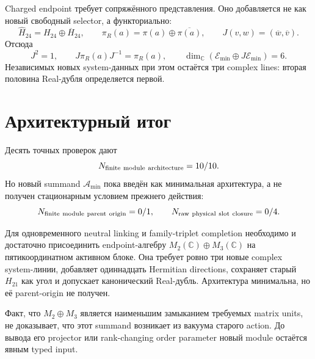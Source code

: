 Charged endpoint требует сопряжённого представления. Оно добавляется не
как новый свободный selector, а функториально:
\begin{equation}
 \widehat H_{24}=H_{24}\oplus\overline{H}_{24},\qquad
 \pi_R(a)=\pi(a)\oplus\overline{\pi(a)},\qquad
 J(v,w)=(\overline w,\overline v).
 \label{eq:v9-finite-module-real-double}
\end{equation}
Отсюда
\begin{equation}
 J^2=1,\qquad J\pi_R(a)J^{-1}=\pi_R(a),
 \qquad
 \dim_{\mathbb C}(\mathcal E_{\min}\oplus J\mathcal E_{\min})=6.
 \label{eq:v9-finite-module-real-identities}
\end{equation}
Независимых новых system-данных при этом остаётся три complex lines:
вторая половина Real-дубля определяется первой.

\section{Архитектурный итог}

Десять точных проверок дают
\begin{equation}
 N_{\rm finite\ module\ architecture}=10/10.
 \label{eq:v9-finite-module-architecture-ledger}
\end{equation}
Но новый summand $\mathcal A_{\min}$ пока введён как минимальная
архитектура, а не получен стационарным условием прежнего действия:
\begin{equation}
 N_{\rm finite\ module\ parent\ origin}=0/1,\qquad
 N_{\rm raw\ physical\ slot\ closure}=0/4.
 \label{eq:v9-finite-module-origin-ledger}
\end{equation}

\begin{theorem}
Для одновременного neutral linking и family-triplet completion необходимо и
достаточно присоединить endpoint-алгебру
$M_2(\mathbb C)\oplus M_3(\mathbb C)$ на пятикоординатном активном блоке.
Она требует ровно три новые complex system-линии, добавляет одиннадцать
Hermitian directions, сохраняет старый $H_{21}$ как угол и допускает
канонический Real-дубль. Архитектура минимальна, но её parent-origin не
получен.
\end{theorem}

\begin{nogocriterion}
Факт, что $M_2\oplus M_3$ является наименьшим замыканием требуемых matrix
units, не доказывает, что этот summand возникает из вакуума старого action.
До вывода его projector или rank-changing order parameter новый module
остаётся явным typed input.
\end{nogocriterion}

